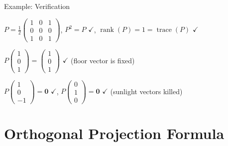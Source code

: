 \documentclass[10pt]{beamer}
\theoremstyle{definition}
\begin{document}
\begin{frame}{Example: Verification}

$P = \frac{1}{2}\begin{pmatrix} 1 & 0 & 1 \\ 0 & 0 & 0 \\ 1 & 0 & 1 \end{pmatrix}$, \quad $P^2 = P$ $\checkmark$, \quad $\operatorname{rank}(P) = 1 = \operatorname{trace}(P)$ $\checkmark$

\vspace{0.5em}

$P\begin{pmatrix} 1\\0\\1 \end{pmatrix} = \begin{pmatrix} 1\\0\\1 \end{pmatrix}$ $\checkmark$ \; (floor vector is fixed)

\vspace{0.3em}

$P\begin{pmatrix} 1\\0\\-1 \end{pmatrix} = \mathbf{0}$ $\checkmark$, \quad $P\begin{pmatrix} 0\\1\\0 \end{pmatrix} = \mathbf{0}$ $\checkmark$ \; (sunlight vectors killed)

\end{frame}


\section{Orthogonal Projection Formula}
\end{document}
